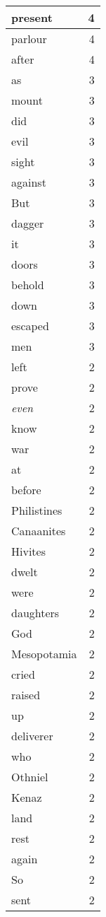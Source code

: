 \begin{center}
\begin{longtable}{l|r}
present & 4 \\ \hline
parlour & 4 \\ \hline
after & 4 \\ \hline
as & 3 \\ \hline
mount & 3 \\ \hline
did & 3 \\ \hline
evil & 3 \\ \hline
sight & 3 \\ \hline
against & 3 \\ \hline
But & 3 \\ \hline
dagger & 3 \\ \hline
it & 3 \\ \hline
doors & 3 \\ \hline
behold & 3 \\ \hline
down & 3 \\ \hline
escaped & 3 \\ \hline
men & 3 \\ \hline
left & 2 \\ \hline
prove & 2 \\ \hline
\emph{even} & 2 \\ \hline
know & 2 \\ \hline
war & 2 \\ \hline
at & 2 \\ \hline
before & 2 \\ \hline
Philistines & 2 \\ \hline
Canaanites & 2 \\ \hline
Hivites & 2 \\ \hline
dwelt & 2 \\ \hline
were & 2 \\ \hline
daughters & 2 \\ \hline
God & 2 \\ \hline
Mesopotamia & 2 \\ \hline
cried & 2 \\ \hline
raised & 2 \\ \hline
up & 2 \\ \hline
deliverer & 2 \\ \hline
who & 2 \\ \hline
Othniel & 2 \\ \hline
Kenaz & 2 \\ \hline
land & 2 \\ \hline
rest & 2 \\ \hline
again & 2 \\ \hline
So & 2 \\ \hline
sent & 2 \\ \hline

\end{longtable}
\end{center}
